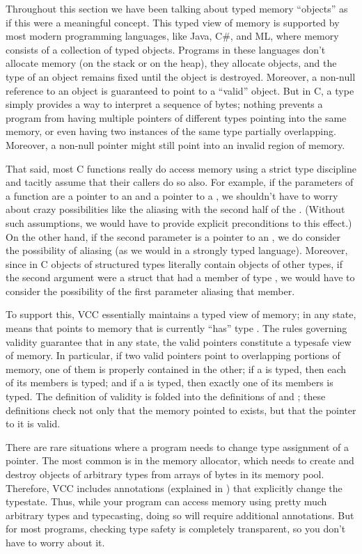 Throughout this section
we have been talking about typed memory ``objects'' as if this were a
meaningful concept.  This typed view of memory is supported by most
modern programming languages, like Java, C\#, and ML, where memory
consists of a collection of typed objects. Programs in these languages
don't allocate memory (on the stack or on the heap), they allocate
objects, and the type of an object remains fixed until the object is
destroyed. Moreover, a non-null reference to an object is guaranteed to
point to a ``valid'' object. But in C, a type simply provides a way to
interpret a sequence of bytes; nothing prevents a program from having
multiple pointers of different types pointing into the same memory, or
even having two instances of the same  type partially
overlapping. Moreover, a non-null pointer might still point into an
invalid region of memory.

That said, most C functions really do access memory using a strict type
discipline and tacitly assume that their callers do
so also. For example, if the parameters of a function are a pointer to
an  and a pointer to a , we shouldn't have to worry
about crazy possibilities like the  aliasing with the second
half of the . (Without such assumptions, we would have to
provide explicit preconditions to this effect.)  On the other hand, if
the second parameter is a pointer to an , we do consider the
possibility of aliasing (as we would in a strongly typed language).
Moreover, since in C objects of structured types literally contain
objects of other types, if the second argument were a struct that had
a member of type , we would have to consider the possibility
of the first parameter aliasing that member. 

To support this, VCC essentially maintains a typed view of memory; in
any state,  means that  points to memory that is
currently ``has'' type . The rules governing validity guarantee
that in any state, the valid pointers constitute a typesafe view of
memory.  In particular, if two valid pointers point to overlapping
portions of memory, one of them is properly contained in the other; if
a  is typed, then each of its members is typed; and if a
 is typed, then exactly one of its members is typed.  The
definition of validity is folded into the definitions of
 and \vcc{\mutable}; these definitions check not
only that the memory pointed to exists, but that the pointer to it is
valid.

There are rare situations where a program needs to change type
assignment of a pointer.  The most common is in the memory allocator,
which needs to create and destroy objects of arbitrary types from
arrays of bytes in its memory pool. Therefore, VCC includes
annotations (explained in ) that explicitly change the
typestate.  Thus, while your program can access memory using pretty
much arbitrary types and typecasting, doing so will require additional
annotations. But for most programs, checking type safety is completely
transparent, so you don't have to worry about it.

